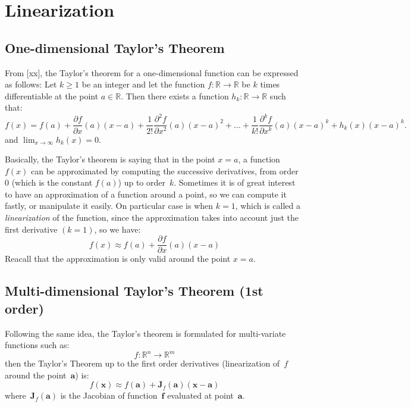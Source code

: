 
\section{Linearization}
\label{sec:Linearization}
\subsection{One-dimensional Taylor's Theorem}
From [xx], the Taylor's theorem for a one-dimensional function can be expressed as follows: Let $k \ge 1$ be an integer and let the function $f:\mathbb{R} \rightarrow \mathbb{R}$ be $k$ times differentiable at the point $a\in\mathbb{R}$. Then there exists a function $h_k:\mathbb{R} \rightarrow \mathbb{R}$ such that:
\begin{equation}
 f(x) = f(a) + \frac{\partial f }{\partial x}(a)(x-a) + \frac{1}{2!}\frac{\partial^2 f }{\partial x^2}(a)(x-a)^2 + \dots
 + \frac{1}{k!}\frac{\partial^k f }{\partial x^k}(a)(x-a)^k + h_k(x)(x-a)^k.
\end{equation}
and $\lim_{x\to\infty}h_k(x)=0$.

Basically, the Taylor's theorem is saying that in the point $x=a$, a function $f(x)$ can be approximated by computing the successive derivatives, from order~$0$ (which is the constant $f(a)$) up to order~$k$. Sometimes it is of great interest to have an approximation of a function around a point, so we can compute it fastly, or manipulate it easily. On particular case is when $k=1$, which is called a \textit{linearization} of the function, since the approximation takes into account just the first derivative $(k=1)$, so we have:
\begin{equation}
f(x) \approx f(a) + \frac{\partial f }{\partial x}(a)(x-a)
\end{equation}
Reacall that the approximation is only valid around the point $x=a$.

\subsection{Multi-dimensional Taylor's Theorem (1st order)}
Following the same idea, the Taylor's theorem is formulated for multi-variate functions such as:
\begin{equation}
 f:\mathbb{R}^n \rightarrow \mathbb{R}^m
\end{equation}
then the Taylor's Theorem up to the first order derivatives (linearization of~$f$ around the point~$\mathbf{a}$) is:
\begin{equation}
f(\mathbf{x}) \approx f(\mathbf{a}) + \mathbf{J}_f(\mathbf{a})(\mathbf{x}-\mathbf{a})
\end{equation}
where~$\mathbf{J}_f(\mathbf{a})$ is the Jacobian of function~$\mathbf{f}$ evaluated at point~$\mathbf{a}$.



